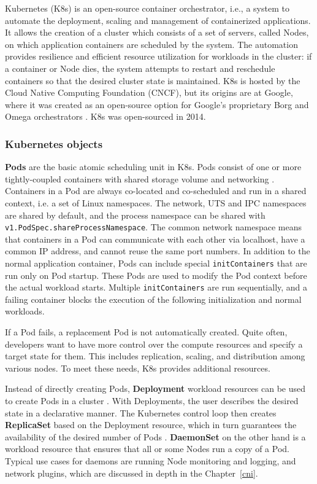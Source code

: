 \documentclass[english, 12pt, a4paper, sci, utf8, a-2b, online]{aaltothesis}
\begin{document}
Kubernetes (K8s) \cite{kubernetes} is an open-source container orchestrator, i.e., a system to automate the deployment, scaling and management of containerized applications. It allows the creation of a cluster which consists of a set of servers, called Nodes, on which application containers are scheduled by the system. The automation provides resilience and efficient resource utilization for workloads in the cluster: if a container or Node dies, the system attempts to restart and reschedule containers so that the desired cluster state is maintained. K8s is hosted by the Cloud Native Computing Foundation (CNCF), but its origins are at Google, where it was created as an open-source option for Google's proprietary Borg and Omega orchestrators \cite{burns2016borg}. K8s was open-sourced in 2014.

\subsubsection{Kubernetes objects}

\textbf{Pods} are the basic atomic scheduling unit in K8s. Pods consist of one or more tightly-coupled containers with shared storage volume and networking \cite{k8s-docs-pods}. Containers in a Pod are always co-located and co-scheduled and run in a shared context, i.e. a set of Linux namespaces. The network, UTS and IPC namespaces are shared by default, and the process namespace can be shared with \texttt{v1.PodSpec.shareProcessNamespace}. The common network namespace means that containers in a Pod can communicate with each other via localhost, have a common IP address, and cannot reuse the same port numbers. In addition to the normal application container, Pods can include special \texttt{initContainers} that are run only on Pod startup. These Pods are used to modify the Pod context before the actual workload starts. Multiple \texttt{initContainers} are run sequentially, and a failing container blocks the execution of the following initialization and normal workloads.

If a Pod fails, a replacement Pod is not automatically created. Quite often, developers want to have more control over the compute resources and specify a target state for them. This includes replication, scaling, and distribution among various nodes. To meet these needs, K8s provides additional resources.

Instead of directly creating Pods, \textbf{Deployment} workload resources can be used to create Pods in a cluster \cite{k8s-docs-pods}. With Deployments, the user describes the desired state in a declarative manner. The Kubernetes control loop then creates \textbf{ReplicaSet} based on the Deployment resource, which in turn guarantees the availability of the desired number of Pods \cite{k8s-docs-deployment}. \textbf{DaemonSet} on the other hand is a workload resource that ensures that all or some Nodes run a copy of a Pod. Typical use cases for daemons are running Node monitoring and logging, and network plugins, which are discussed in depth in the Chapter~\ref{cni}.
\end{document}
